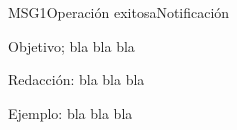 \begin{mensaje}{MSG1}{Operación exitosa}{Notificación}
	\item[Objetivo;] bla bla bla 
	\item[Redacción:] bla bla bla
	\item[Ejemplo:] bla bla bla
\end{mensaje}

